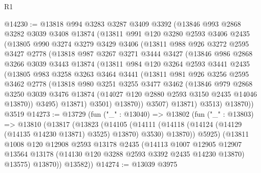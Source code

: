 \begin{lexlean}{R1}
\begin{coremodule}
@14230 := @13818
    @994
    @3283
    @3287
    @3409
    @3392
    (@13846
      @993
      @2868
      @3282
      @3039
      @3408
      @13874
      (@13811
        @991
        @120
        @3280
        @2593
        @3406
        @2435
        (@13805
          @990
          @3274
          @3279
          @3429
          @3406
          (@13811
            @988
            @926
            @3272
            @2595
            @3427
            @2778
            (@13818
              @987
              @3267
              @3271
              @3444
              @3427
              (@13846
                @986
                @2868
                @3266
                @3039
                @3443
                @13874
                (@13811
                  @984
                  @120
                  @3264
                  @2593
                  @3441
                  @2435
                  (@13805
                    @983
                    @3258
                    @3263
                    @3464
                    @3441
                    (@13811
                      @981
                      @926
                      @3256
                      @2595
                      @3462
                      @2778
                      (@13818
                        @980
                        @3251
                        @3255
                        @3477
                        @3462
                        (@13846
                          @979
                          @2868
                          @3250
                          @3039
                          @3476
                          @13874
                          (@14027 @120 @2880 @2593 @3150 @2435 @14046 @13870))
                        @3495)
                      @13871)
                    @3501)
                  @13870))
              @3507)
            @13871)
          @3513)
        @13870))
    @3519
@14273 := @13729
    (fun ("_" : @13040) =>
    @13802
      (fun ("_" : @13803) =>
      @13810
        (@13817
          (@13823
            (@14105
              (@14111 (@14118 (@14124 (@14129 (@14135 @14230 @13871) @3525) @13870) @3530) @13870))
            @5925)
          (@13811
            @1008
            @120
            @12908
            @2593
            @13178
            @2435
            (@14113
              @1007
              @12905
              @12907
              @13564
              @13178
              (@14130 @120 @3288 @2593 @3392 @2435 @14230 @13870)
              @13575)
            @13870))
        @13582))
@14274 := @13039 @3975

\end{coremodule}
\end{lexlean}
